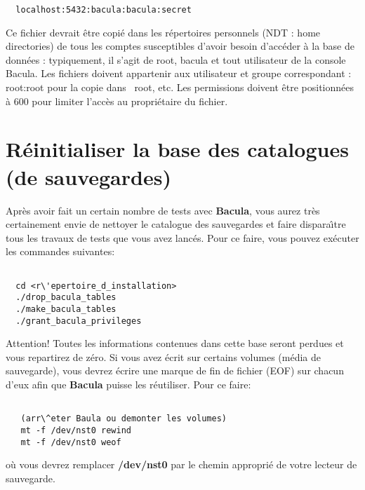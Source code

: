 {{{{\footnotesize
\begin{verbatim}
  localhost:5432:bacula:bacula:secret
\end{verbatim}
\normalsize

Ce fichier devrait \^etre copi\'e dans les r\'epertoires personnels (NDT : home directories) 
de tous les comptes susceptibles d'avoir besoin d'acc\'eder \`a la base de donn\'ees : 
typiquement, il s'agit de root, bacula et tout utilisateur de la console Bacula. Les fichiers 
doivent appartenir aux utilisateur et groupe correspondant : root:root pour la copie 
dans ~root, etc. Les permissions doivent \^etre positionn\'ees \`a 600 pour limiter 
l'acc\`es au propri\'etaire du fichier.

\section{R\'einitialiser la base des catalogues (de sauvegardes)}

Apr\`es avoir fait un certain nombre de tests avec {\bf Bacula}, vous aurez
tr\`es certainement envie de nettoyer le catalogue des sauvegardes et faire
dispara{\^\i}tre tous les travaux de tests que vous avez lanc\'es. Pour ce
faire, vous pouvez ex\'ecuter les commandes suivantes: 

\footnotesize
\begin{verbatim}

  cd <r\'epertoire_d_installation>
  ./drop_bacula_tables
  ./make_bacula_tables
  ./grant_bacula_privileges
\end{verbatim}
\normalsize

Attention! Toutes les informations contenues dans cette base seront perdues et
vous repartirez de z\'ero. Si vous avez \'ecrit sur certains volumes (m\'edia
de sauvegarde), vous devrez \'ecrire une marque de fin de fichier (EOF) sur
chacun d'eux afin que {\bf Bacula} puisse les r\'eutiliser. Pour ce faire: 

\footnotesize
\begin{verbatim}

   (arr\^eter Baula ou demonter les volumes)
   mt -f /dev/nst0 rewind
   mt -f /dev/nst0 weof
\end{verbatim}
\normalsize

o\`u vous devrez remplacer {\bf /dev/nst0} par le chemin appropri\'e de votre
lecteur de sauvegarde. 

}}}}
